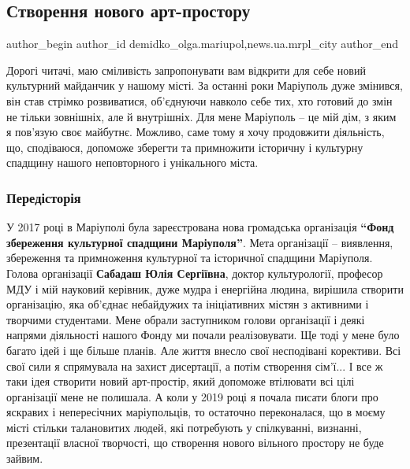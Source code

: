  
 
 
 
 
 
\subsection{Створення нового арт-простору}
\label{sec:27_02_2020.stz.news.ua.mrpl_city.1.novyj_art_prostir}
 
\ifcmt
 author_begin
   author_id demidko_olga.mariupol,news.ua.mrpl_city
 author_end
\fi

Дорогі читачі, маю сміливість запропонувати вам відкрити для себе новий
культурний майданчик у нашому місті. За останні роки Маріуполь дуже змінився,
він став стрімко розвиватися, об'єднуючи навколо себе тих, хто готовий до змін
не тільки зовнішніх, але й внутрішніх. Для мене Маріуполь – це мій дім, з яким
я пов'язую своє майбутнє. Можливо, саме тому я хочу продовжити діяльність, що,
сподіваюся, допоможе зберегти та примножити історичну і культурну спадщину
нашого неповторного і унікального міста.

\subsubsection{Передісторія}

У 2017 році в Маріуполі була зареєстрована нова громадська організація \textbf{\enquote{Фонд
збереження культурної спадщини Маріуполя}}. Мета організації – виявлення,
збереження та примноження культурної та історичної спадщини Маріуполя. Голова
організації \textbf{Сабадаш Юлія Сергіївна}, доктор культурології, професор МДУ і мій
науковий керівник, дуже мудра і енергійна людина, вирішила створити
організацію, яка об'єднає небайдужих та ініціативних містян з активними і
творчими студентами. Мене обрали заступником голови організації і деякі напрями
діяльності нашого Фонду ми почали реалізовувати. Ще тоді у мене було багато
ідей і ще більше планів. Але життя внесло свої несподівані корективи. Всі свої
сили я спрямувала на захист дисертації, а потім створення сім'ї... І все ж таки
ідея створити новий арт-простір, який допоможе втілювати всі цілі організації
мене не полишала. А коли у 2019 році я почала писати блоги про яскравих і
непересічних маріупольців, то остаточно переконалася, що в моєму місті стільки
талановитих людей, які потребують у спілкуванні, визнанні, презентації власної
творчості, що створення нового вільного простору не буде зайвим. 

